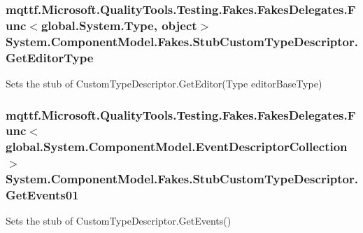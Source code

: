 \hypertarget{class_system_1_1_component_model_1_1_fakes_1_1_stub_custom_type_descriptor_a94f48002c674eb60c8a7b336315383a3}{
\subsubsection[{Get\-Editor\-Type}]{\setlength{\rightskip}{0pt plus 5cm}mqttf.\-Microsoft.\-Quality\-Tools.\-Testing.\-Fakes.\-Fakes\-Delegates.\-Func$<$global.\-System.\-Type, object$>$ System.\-Component\-Model.\-Fakes.\-Stub\-Custom\-Type\-Descriptor.\-Get\-Editor\-Type}}\label{class_system_1_1_component_model_1_1_fakes_1_1_stub_custom_type_descriptor_a94f48002c674eb60c8a7b336315383a3}


Sets the stub of Custom\-Type\-Descriptor.\-Get\-Editor(\-Type editor\-Base\-Type)

\hypertarget{class_system_1_1_component_model_1_1_fakes_1_1_stub_custom_type_descriptor_a049366c7a908a5f29cfc6a69f6f86b9c}{
\subsubsection[{Get\-Events01}]{\setlength{\rightskip}{0pt plus 5cm}mqttf.\-Microsoft.\-Quality\-Tools.\-Testing.\-Fakes.\-Fakes\-Delegates.\-Func$<$global.\-System.\-Component\-Model.\-Event\-Descriptor\-Collection$>$ System.\-Component\-Model.\-Fakes.\-Stub\-Custom\-Type\-Descriptor.\-Get\-Events01}}\label{class_system_1_1_component_model_1_1_fakes_1_1_stub_custom_type_descriptor_a049366c7a908a5f29cfc6a69f6f86b9c}


Sets the stub of Custom\-Type\-Descriptor.\-Get\-Events()

